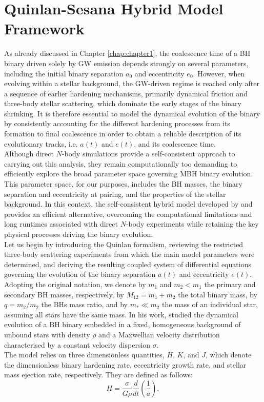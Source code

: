 \documentclass[12pt,twoside,openany]{book}
\begin{document}
\section{Quinlan-Sesana Hybrid Model Framework}
\label{sec:Quinlan-Sesana Hybrid Model}
As already discussed in Chapter \ref{chap:chapter1}, the coalescence time of a BH binary driven solely by GW emission depends strongly on several parameters, including the initial binary separation $a_0$ and eccentricity $e_0$. However, when evolving within a stellar background, the GW-driven regime is reached only after a sequence of earlier hardening mechanisms, primarily dynamical friction and three-body stellar scattering, which dominate the early stages of the binary shrinking. It is therefore essential to model the dynamical evolution of the binary by consistently accounting for the different hardening processes from its formation to final coalescence in order to obtain a reliable description of its evolutionary tracks, i.e. $a(t)$ and $e(t)$, and its coalescence time.\\Although direct $N$-body simulations provide a self-consistent approach to carrying out this analysis, they remain computationally too demanding to efficiently explore the broad parameter space governing MBH binary evolution. This parameter space, for our purposes, includes the BH masses, the binary separation and eccentricity at pairing, and the properties of the stellar background. In this context, the self-consistent hybrid model developed by \textcite{Quinlan_1996} and \textcite{Sesana_2010} provides an efficient alternative, overcoming the computational limitations and long runtimes associated with direct $N$-body experiments while retaining the key physical processes driving the binary evolution.\\Let us begin by introducing the Quinlan formalism, reviewing the restricted three-body scattering experiments from which the main model parameters were determined, and deriving the resulting coupled system of differential equations governing the evolution of the binary separation $a(t)$ and eccentricity $e(t)$. Adopting the original notation, we denote by $m_1$ and $m_2<m_1$ the primary and secondary BH masses, respectively, by $M_{12}=m_1+m_2$ the total binary mass, by $q=m_2/m_2$ the BHs mass ratio, and by $m_*\ll m_2$ the mass of an individual star, assuming all stars have the same mass. In his work, \textcite{Quinlan_1996} studied the dynamical evolution of a BH binary embedded in a fixed, homogeneous background of unbound stars with density $\rho$ and a Maxwellian velocity distribution characterised by a constant velocity dispersion $\sigma$.\\The model relies on three dimensionless quantities, $H$, $K$, and $J$, which denote the dimensionless binary hardening rate, eccentricity growth rate, and stellar mass ejection rate, respectively. They are defined as follows:
\begin{equation}\label{H Q96}
    H=\frac{\sigma}{G\rho}\frac{d}{dt}\left(\frac{1}{a}\right),
\end{equation}
\end{document}
